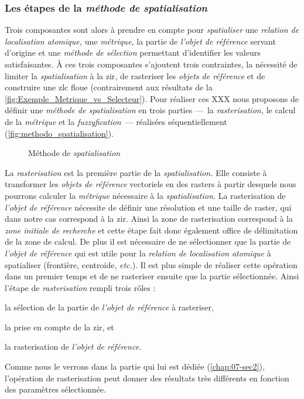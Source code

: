 \subsubsection{Les étapes de la \emph{méthode de spatialisation}}

Trois composantes sont alors à prendre en compte pour \emph{spatialiser} une \emph{relation de localisation atomique,} une \emph{métrique,} la partie de \emph{l'objet de référence} servant d'origine et une \emph{méthode de sélection} permettant d'identifier les valeurs satisfaisantes.
%
À ces trois composantes s'ajoutent trois contraintes, la nécessité de limiter la \emph{spatialisation} à la \ac{zir}, de rasteriser les \emph{objets de référence} et de construire une \ac{zlc} floue (contrairement aux résultats de la \autoref{fig:Exemple_Metrique_vs_Selecteur}).
%
Pour réaliser ces XXX nous proposons de définir une \emph{méthode de spatialisation} en trois parties ---~la \emph{rasterisation,} le calcul de la \emph{métrique} et la \emph{fuzzyfication}~--- réalisées séquentiellement (\autoref{fig:methodo_spatialisation}).

\begin{figure}
  \centering
  
  \caption{Méthode de \emph{spatialisation}}
  \label{fig:methodo_spatialisation}
\end{figure}

La \emph{rasterisation} est la première partie de la \emph{spatialisation.} Elle consiste à transformer les \emph{objets de référence} vectoriels en des rasters à partir desquels nous pourrons calculer la \emph{métrique} nécessaire à la \emph{spatialisation.} La rasterisation de \emph{l'objet de référence} nécessite de définir une résolution et une taille de raster, qui dans notre cas correspond à la \ac{zir}. Ainsi la zone de rasterisation correspond à la \emph{zone initiale de recherche} et cette étape fait donc également office de délimitation de la zone de calcul. De plus il est nécessaire de ne sélectionner que la partie de \emph{l'objet de référence} qui est utile pour la \emph{relation de localisation atomique} à spatialiser (\eg frontière, centroide, \emph{etc.}). Il est plus simple de réaliser cette opération dans un premier temps et de ne rasteriser ensuite que la partie sélectionnée. Ainsi l'étape de \emph{rasterisation} rempli trois rôles :
%
\begin{enumerate*}[label=(\alph*)]
\item la sélection de la partie de \emph{l'objet de référence} à rasteriser,
\item la prise en compte de la \ac{zir}, et
\item la rasterisation de \emph{l'objet de référence.}  
\end{enumerate*}
%
Comme nous le verrons dans la partie qui lui est dédiée (\autoref{chap:07-sec2}), l'opération de rasterisation peut donner des résultats très différents en fonction des paramètres sélectionnée.

